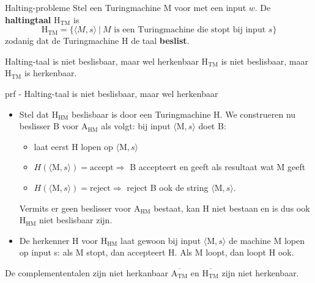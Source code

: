\newpage

\begin{theo}{Halting-probleme}
    Stel een Turingmachine M voor met een input $w$. De \textbf{haltingtaal} H$_{\text{TM}}$ is 
    \begin{equation*}
        \text{H}_{\text{TM}} = \{ \langle M,s \rangle \ | \ M \text{ is een Turingmachine die stopt bij input } s \}
    \end{equation*}
    zodanig dat de Turingmachine H de taal \textbf{beslist}.
\end{theo} 

\begin{lem}{Halting-taal is niet beslisbaar, maar wel herkenbaar}
    H$_{\text{TM}}$ is niet beslisbaar, maar H$_{\text{TM}}$ is herkenbaar.
\end{lem}

\begin{prf}{prf - Halting-taal is niet beslisbaar, maar wel herkenbaar}
    \begin{itemize}
        \item 
            Stel dat H$_{\text{HM}}$ beslisbaar is door een Turingmachine H. We construeren nu beslisser B voor A$_{\text{HM}}$ als volgt: bij input $\langle \text{M} ,s \rangle$ doet B:
            \begin{itemize}
                \item laat eerst H lopen op $\langle \text{M} ,s \rangle$
                \item $H(\langle \text{M} ,s \rangle) = \text{accept} \Rightarrow$ B accepteert en geeft als resultaat wat M geeft 
                \item $H(\langle \text{M} ,s \rangle) = \text{reject} \Rightarrow$ reject B ook de string $\langle \text{M} ,s \rangle$. 
            \end{itemize}
            Vermits er geen beslisser voor A$_{\text{HM}}$ bestaat, kan H niet bestaan en is dus ook H$_{\text{HM}}$ niet beslisbaar zijn.
        \item
            De herkenner H voor H$_{\text{HM}}$ laat gewoon bij input $\langle \text{M} ,s \rangle$ de machine M lopen op input s: als M stopt, dan accepteert H. Als M loopt, dan loopt H ook.
    \end{itemize}
\end{prf}

\begin{lem}{De complemententalen zijn niet herkanbaar}
    $\overline{\text{A}_{\text{TM}}}$ en $\overline{\text{H}_{\text{TM}}}$ zijn niet herkenbaar.
\end{lem}

